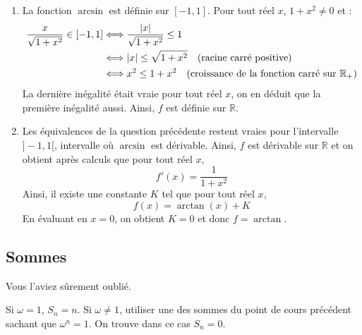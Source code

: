 \documentclass[a4paper,twoside,french,11pt]{VcCours}
\begin{document}
\begin{enumerate}
\item La fonction $\arcsin$ est définie sur $[-1,1]$. Pour tout réel $x$, $1+x^2 \neq 0$ et :
\begin{align*}
\dfrac{x}{\sqrt {1 + x^{2}}} \in [-1,1] & \Longleftrightarrow \dfrac{\vert x \vert }{\sqrt {1 + x^{2}}} \leq 1\\
& \Longleftrightarrow \vert x \vert \leq \sqrt{1+x^2} \quad \hbox{(racine carré positive)} \\
& \Longleftrightarrow x^2 \leq 1+x^2 \quad \hbox{(croissance de la fonction carré sur } \mathbb{R}_+)
\end{align*}
La dernière inégalité était vraie pour tout réel $x$, on en déduit que la première inégalité aussi. Ainsi, $f$ est définie sur $\mathbb{R}$.
\item Les équivalences de la question précédente restent vraies pour l'intervalle $]-1,1[$, intervalle où $\arcsin$ est dérivable. Ainsi, $f$ est dérivable sur $\mathbb{R}$ et on obtient après calculs que pour tout réel $x$,
$$ f'(x) = \dfrac{1}{1+x^2}$$
Ainsi, il existe une constante $K$ tel que pour tout réel $x$,
$$ f(x) = \arctan(x)+ K$$
En évaluant en $x=0$, on obtient $K=0$ et donc $f = \arctan$.
\end{enumerate}

\subsection{Sommes}
%



\begin{Exercice}{}\end{Exercice}Vous l'aviez sûrement oublié.

 

\begin{Exercice}{}\end{Exercice}Si $\omega=1$, $S_n= n$. Si $\omega \neq 1$, utiliser une des sommes du point de cours précédent sachant que $\omega^n=1$. On trouve dans ce cas $S_n=0$.




\begin{Exercice}{}\end{Exercice}
\end{document}
